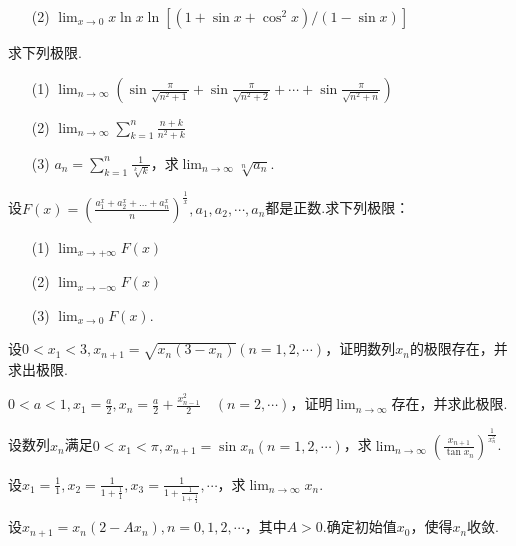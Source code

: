\begin{xiti}
\begin{enumerate}
	\item[(2)] $\lim _ { x \rightarrow 0 } x \ln x \ln \left[ \left( 1 + \sin x + \cos ^ { 2 } x \right) / ( 1 - \sin x ) \right]$
\end{enumerate}
\item 求下列极限.
\begin{enumerate}
	\item[(1)] $\lim _ { n \rightarrow \infty } \left( \sin \frac { \pi } { \sqrt { n ^ { 2 } + 1 } } + \sin \frac { \pi } { \sqrt { n ^ { 2 } + 2 } } + \cdots + \sin \frac { \pi } { \sqrt { n ^ { 2 } + n } } \right)$
	\item[(2)] $\lim _ { n \rightarrow \infty } \sum _ { k = 1 } ^ { n } \frac { n + k } { n ^ { 2 } + k }$
	\item[(3)] $a _ { n } = \sum _ { k = 1 } ^ { n } \frac { 1 } { \sqrt [ k ] { k } }$，求$\lim _ { n \rightarrow \infty } \sqrt [ n ] { a _ { n } }$.
\end{enumerate}
\item 设$F ( x ) = \left( \frac { a _ { 1 } ^ { x } + a _ { 2 } ^ { x } + \ldots + a _ { n } ^ { x } } { n } \right) ^ { \frac { 1 } { x } } , a _ { 1 } , a _ { 2 } , \cdots , a _ { n }$都是正数.求下列极限：
\begin{enumerate}
	\item[(1)] $\lim _ { x \rightarrow + \infty } F ( x )$
	\item[(2)] $\lim _ { x \rightarrow - \infty } F ( x )$
	\item[(3)] $\lim _ { x \rightarrow 0 } F ( x )$.
\end{enumerate}
\item 设$0<x_{1}<3,x _ { n + 1 } = \sqrt { x _ { n } \left( 3 - x _ { n } \right) } ( n = 1,2 , \cdots )$，证明数列${x_{n}}$的极限存在，并求出极限.
\item $0 < a < 1 , x _ { 1 } = \frac { a } { 2 } , x _ { n } = \frac { a } { 2 } + \frac { x _ { n - 1 } ^ { 2 } } { 2 } \quad ( n = 2 , \cdots )$，证明$\lim_{ n \rightarrow \infty }$存在，并求此极限.
\item 设数列${x_{n}}$满足$0 < x _ { 1 } < \pi , x _ { n + 1 } = \sin x _ { n } ( n = 1,2 , \cdots )$，求$\lim _ { n \rightarrow \infty } \left( \frac { x _ { n + 1 } } { \tan x _ { n } } \right) ^ { \frac { 1 } { x _ { n } ^ { 2 } } }$.
\item 设$x _ { 1 } = \frac { 1 } { 1 } , x _ { 2 } = \frac { 1 } { 1 + \frac { 1 } { 1 } } , x _ { 3 } = \frac { 1 } { 1 + \frac { 1 } { 1 + \frac { 1 } { 1 } } } , \cdots$，求$\lim_{ n \rightarrow \infty }x_{n}$.
\item 设$x _ { n + 1 } = x _ { n } \left( 2 - A x _ { n } \right) , n = 0,1,2 , \cdots$，其中$A>0$.确定初始值$x_{0}$，使得${x_{n}}$收敛.

\end{xiti}
